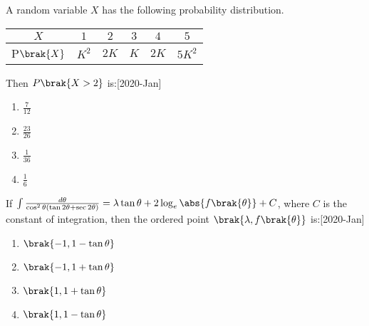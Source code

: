 \item A random variable $X$ has the following probability distribution.
    \begin{table}[h!]    
        \centering
        \begin{tabular}{|c|c|c|c|c|c|} \hline $X$ & $1$ & $2$ & $3$ & $4$ & $5$ \\ \hline P$\brak{X}$ & $K^2$ & $2K$ & $K$ & $2K$ & $5 K^2$ \\ \hline \end{tabular}
    \end{table}
    Then $P\brak{X>2}$ is:\hfill[2020-Jan]
    \begin{multicols}{2}
    \begin{enumerate}
        \item $\frac{7}{12}$\\
        \item $\frac{23}{26}$
        \item $\frac{1}{36}$\\
        \item $\frac{1}{6}$\\
    \end{enumerate}
    \end{multicols}

    \item If $\int \frac{d\theta}{\cos^2 \theta (\tan 2\theta + \sec 2 \theta)} = \lambda \tan \theta + 2 \log_e \abs {f\brak{\theta}}  + C$, where $C$ is the constant of integration, then the ordered point $\brak{\lambda, f\brak{\theta}}$ is:\hfill[2020-Jan]
    \begin{multicols}{2}
    \begin{enumerate}
        \item $\brak{-1, 1-\tan \theta}$\\
        \item $\brak{-1, 1+\tan \theta}$\\
        \item $\brak{1, 1+\tan \theta}$\\
        \item $\brak{1, 1-\tan \theta}$
    \end{enumerate}
    \end{multicols}


